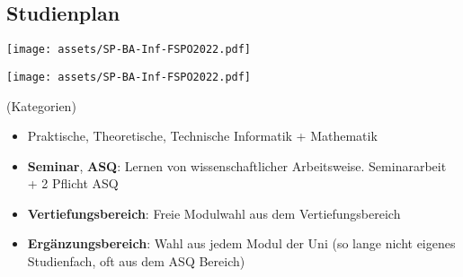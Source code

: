 \documentclass[
	aspectratio=169, 
	10pt 
]{beamer}
\begin{document}
\subsection{Studienplan}
\begin{frame}{\insertsubsection}
    \begin{fancycolumns}[widths={48}]
        \nextcolumn
        \texttt{[image: assets/SP-BA-Inf-FSPO2022.pdf]}
    \end{fancycolumns}
\end{frame}

\begin{frame}{\insertsubsection}
    \texttt{[image: assets/SP-BA-Inf-FSPO2022.pdf]}
\end{frame}

\begin{frame}{\insertsubsection\space(Kategorien)}
    \begin{itemize}
        \item Praktische, Theoretische, Technische Informatik + Mathematik
        \item \textbf{Seminar}, \textbf{ASQ}: Lernen von wissenschaftlicher Arbeitsweise. Seminararbeit + 2 Pflicht ASQ
        \item \textbf{Vertiefungsbereich}: Freie Modulwahl aus dem Vertiefungsbereich 
        \item \textbf{Ergänzungsbereich}: Wahl aus jedem Modul der Uni (so lange nicht eigenes Studienfach, oft aus dem ASQ Bereich)
    \end{itemize}
\end{frame}
\end{document}
